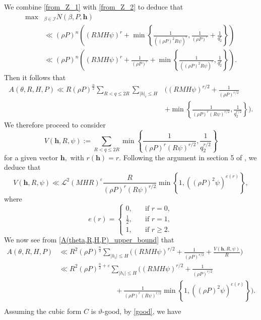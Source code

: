 \documentclass[12pt]{amsart}
\theoremstyle{definition}
\numberwithin{equation}{section}
\begin{document}
We combine \eqref{from_Z_1} with \eqref{from_Z_2} to deduce that
\begin{equation*}
    \begin{split}
        \mathop{\max}&_{\beta \in \mathcal{I}} N(\beta, P, \boldsymbol{h}) \\
        &\ll (\rho P)^{n}\left((RMH\psi)^r+\min\left\{\frac{1}{\left((\rho P)^2R\psi\right)^{r}}, \frac{1}{(\rho P)^{r}}+\frac{1}{q_2^r}\right\}\right)\\
        &\ll (\rho P)^{n}\left((RMH\psi)^r+\frac{1}{(\rho P)^{r}}+\min\left\{\frac{1}{\left((\rho P)^2R\psi\right)^{r}}, \frac{1}{q_2^r}\right\}\right).
    \end{split}
\end{equation*}
Then it follows that
\begin{equation}
    \label{A(theta,R,H,P)_upper_bound}
    \begin{split}
        A(\theta, R, H, P)\ll R(\rho P)^{\frac{n}{2}}\sum_{R<q\leq 2R}\sum_{|h|_i\leq H}
        &\bigg((RMH\psi)^{r/2}+\frac{1}{(\rho P)^{r/2}}\\
        &+\min\left\{\frac{1}{(\rho P)^r(R\psi)^{r/2}}, \frac{1}{q_2^{r/2}}\right\} \bigg).
        \end{split}
\end{equation}
We therefore proceed to consider
\begin{equation*}
    V(\boldsymbol{h}, R, \psi):=\sum_{R<q\leq 2R}\min\left\{\frac{1}{(\rho P)^r(R\psi)^{r/2}}, \frac{1}{q_2^{r/2}}\right\}
\end{equation*}
for a given vector $\boldsymbol{h},$ with $r(\boldsymbol{h})=r.$
Following the argument in section 5 of \cite{heath2007cubic}, we deduce that
\begin{equation*}
    V(\boldsymbol{h}, R, \psi)\ll \mathcal{L}^2(MHR)^{\varepsilon}\frac{R}{(\rho P)^r(R\psi)^{r/2}}\min\left\{1, \left((\rho P)^2\psi\right)^{e(r)}\right\},
\end{equation*}
where
\begin{equation*}
    e(r)=
    \begin{cases}
        0,\quad &\text{if }r=0,\\
        \frac{1}{2},\quad &\text{if }r=1,\\
        1,\quad &\text{if }r\geq 2.
    \end{cases}
\end{equation*}
We now see from \eqref{A(theta,R,H,P)_upper_bound} that
\begin{equation*}
    \begin{split}
        A(\theta, R, H, P)
        &\ll R^2(\rho P)^{\frac{n}{2}}\sum_{|h_i|\leq H}\bigg((RMH\psi)^{r/2}+\frac{1}{(\rho P)^{r/2}}+\frac{V(\boldsymbol{h}, R, \psi)}{R} \bigg)\\
        &\ll R^2(\rho P)^{\frac{n}{2}+\varepsilon}\sum_{|h_i|\leq H}\bigg((RMH\psi)^{r/2}+\frac{1}{(\rho P)^{r/2}}\\
        &\qquad\qquad\qquad\qquad+\frac{1}{(\rho P)^r(R\psi)^{r/2}}\min\left\{1, \left((\rho P)^2\psi\right)^{e(r)}\right\} \bigg).\\
    \end{split}
\end{equation*}
Assuming the cubic form $C$ is $\vartheta$-good, by \eqref{good}, we have
\end{document}
